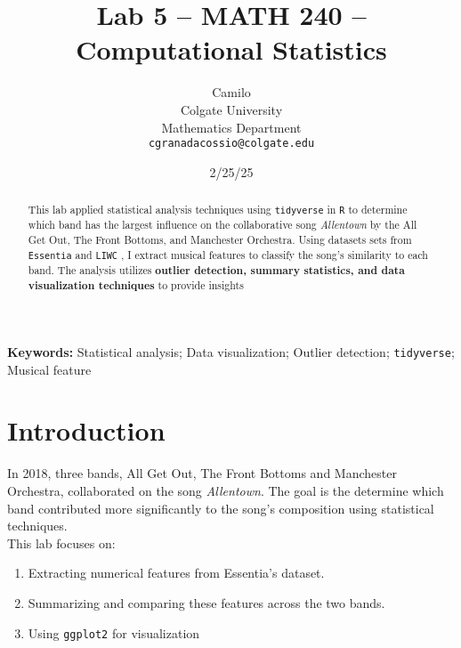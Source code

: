 \documentclass{article}\usepackage[]{graphicx}\usepackage[]{xcolor}
\begin{document}
\vspace{-1in}
\title{Lab 5 -- MATH 240 -- Computational Statistics}

\author{
  Camilo \\
  Colgate University  \\
  Mathematics Department  \\
  {\tt cgranadacossio@colgate.edu}
}

\date{2/25/25}

\maketitle

\begin{multicols}{2}
\begin{abstract}
This lab applied statistical analysis techniques using \texttt{tidyverse} \citep{tidyverse} in \texttt{R} to determine which band has the largest influence on the collaborative song \textit{Allentown} by the All Get Out, The Front Bottoms, and Manchester Orchestra. Using datasets sets from \texttt{Essentia} \citep{essentia} and \texttt{LIWC} \citep{liwc}, I extract musical features to classify the song's similarity to each band. The analysis utilizes \textbf{outlier detection, summary statistics, and data visualization techniques} to provide insights
\end{abstract}

\noindent \textbf{Keywords:} Statistical analysis; Data visualization; Outlier detection; \texttt{tidyverse}; Musical feature

\section{Introduction}

In 2018, three bands, All Get Out, The Front Bottoms and Manchester Orchestra, collaborated on the song \textit{Allentown}. The goal is the determine which band contributed more significantly to the song's composition using statistical techniques.\\

\noindent This lab focuses on:
\begin{enumerate}
\item Extracting numerical features from Essentia's dataset.
\item Summarizing and comparing these features across the two bands.
\item Using \texttt{ggplot2} \citep{gg} for visualization
\end{enumerate}


\end{multicols}
\end{document}
